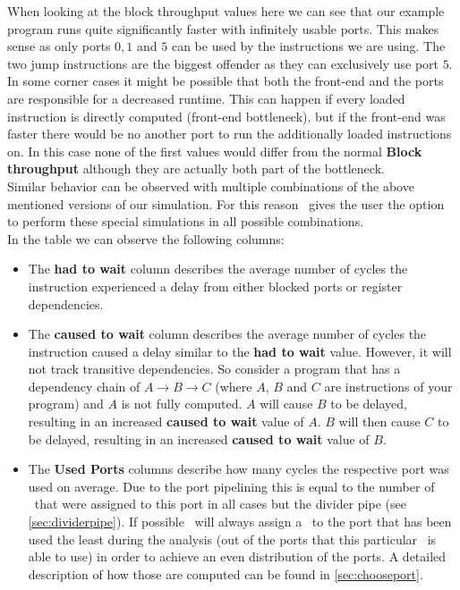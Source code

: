 When looking at the block throughput values here we can see that our example program runs quite significantly faster with infinitely usable ports. This makes sense as only ports $0, 1$ and $5$ can be used by the instructions we are using. The two jump instructions are the biggest offender as they can exclusively use port $5$.\\

In some corner cases it might be possible that both the front-end and the ports are responsible for a decreased runtime. This can happen if every loaded instruction is directly computed (front-end bottleneck), but if the front-end was faster there would be no another port to run the additionally loaded instructions on. In this case none of the first values would differ from the normal \textbf{Block throughput} although they are actually both part of the bottleneck.\\
Similar behavior can be observed with multiple combinations of the above mentioned versions of our simulation. For this reason \suaca\ gives the user the option to perform these special simulations in all possible combinations.\\


In the table we can observe the following columns:
\begin{itemize}
    \item The \textbf{had to wait} column describes the average number of cycles the instruction experienced a delay from either blocked ports or register dependencies. 
    \item The \textbf{caused to wait} column describes the average number of cycles the instruction caused a delay similar to the \textbf{had to wait} value. However, it will not track transitive dependencies. So consider a program that has a dependency chain of $A \rightarrow B \rightarrow C$ (where $A$, $B$ and $C$ are instructions of your program) and $A$ is not fully computed. $A$ will cause $B$ to be delayed, resulting in an increased \textbf{caused to wait} value of $A$. $B$ will then cause $C$ to be delayed, resulting in an increased \textbf{caused to wait} value of $B$.
    \item The \textbf{Used Ports} columns describe how many cycles the respective port was used on average. Due to the port pipelining this is equal to the number of \microops\ that were assigned to this port in all cases but the divider pipe (see \autoref{sec:dividerpipe}). If possible \suaca\ will always assign a \microop\ to the port that has been used the least during the analysis (out of the ports that this particular \microop\ is able to use) in order to achieve an even distribution of the ports. A detailed description of how those are computed can be found in \autoref{sec:chooseport}.
\end{itemize}

